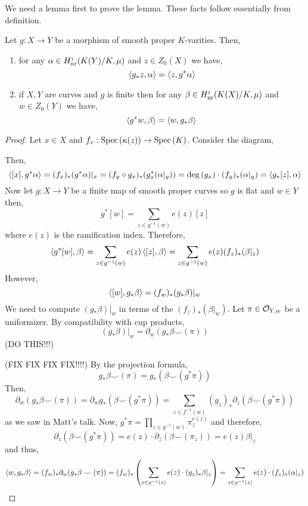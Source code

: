 \documentclass[12pt]{article}
\begin{document}
\begin{rmk}
We need a lemma first to prove the lemma. These facts follow essentially from definition.
\end{rmk}

\begin{lemma}
Let $g : X \to Y$ be a morphism of smooth proper $K$-varities. Then,
\begin{enumerate}
\item for any $\alpha \in H^i_{\mathrm{nr}}(K(Y)/K, \mu)$ and $z \in Z_0(X)$ we have,
\[ \left< g_* z, \alpha \right> = \left< z, g^* \alpha \right> \]
\item if $X, Y$ are curves and $g$ is finite then for any $\beta \in H^i_{\mathrm{nr}}(K(X)/K, \mu)$ and $w \in Z_0(Y)$ we have,
\[ \left< g^* w, \beta \right> = \left< w, g_* \beta \right> \]
\end{enumerate}
\end{lemma}

\begin{proof}
Let $x \in X$ and $f_x : \mathrm{Spec}\left( \kappa(z) \right) \to \mathrm{Spec}\left( K \right)$.
Consider the diagram,
\begin{center}
\end{center}
Then,
\[ \left< [x], g^* \alpha \right> = (f_x)_* (g^* \alpha)|_x = (f_y \circ g_x)_* (g_x^* (\alpha|_y)) = \deg{(g_x)} \cdot (f_y)_* (\alpha|_y) = \left< g_* [z], \alpha \right> \]
Now let $g : X \to Y$ be a finite map of smooth proper curves so $g$ is flat and $w \in Y$ then,
\[ g^* [w] = \sum_{z \in g^{-1}(w)} e(z) [z] \]
where $e(z)$ is the ramification index. Therefore,
\[ \left< g^* [w], \beta \right> = \sum_{z \in g^{-1}(w)} e(z) \left< [z], \beta \right> = \sum_{z \in g^{-1}(w)} e(z) (f_z)_*(\beta|_z) \]
However, 
\[ \left< [w], g_* \beta \right> = (f_w)_*(g_* \beta)|_w \]
We need to compute $(g_* \beta)|_w$ in terms of the $(f_z)_* (\beta|_w)$. Let $\pi \in \mathcal{O}_{Y, w}$ be a uniformizer. By compatibility with cup products,
\[ (g_* \beta)|_w = \partial_w (g_* \beta \smile (\pi)) \]
(DO THIS!!!) 


(FIX FIX FIX FIX!!!!)
By the projection formula,
\[ g_* \beta \smile (\pi) = g_*(\beta \smile (g^* \pi)) \]
Then,
\[ \partial_w(g_* \beta \smile (\pi)) = \partial_w g_*(\beta \smile (g^* \pi)) = \sum_{z \in f^{-1}(w)} (g_z)_* \partial_z (\beta \smile (g^* \pi)) \]
as we saw in Matt's talk. Now, $g^* \pi = \prod_{z \in g^{-1}(w)} \pi_z^{e(z)}$ and therefore,
\[ \partial_{z}(\beta \smile (g^* \pi)) = e(z) \cdot \partial_z(\beta \smile (\pi_z)) = e(z) \beta|_z \]
and thus,
\[ \left< w, g_* \beta \right> = (f_w)_* \partial_w (g_* \beta \smile (\pi)) = (f_w)_* \left( \sum_{z \in g^{-1}(z)} e(z) \cdot (g_z)_* \beta|_z \right) = \sum_{z \in g^{-1}(z)} e(z) \cdot (f_z)_* (\alpha|_z) \]
\end{proof}
\end{document}
